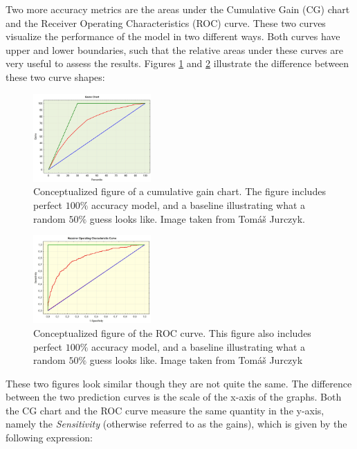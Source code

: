             Two more accuracy metrics are the areas under the Cumulative Gain (CG) chart and the Receiver Operating Characteristics (ROC) curve. These two curves visualize the performance of the model in two different ways. Both curves have upper and lower boundaries, such that the relative areas under these curves are very useful to assess the results. Figures \ref{fig:conceptual_cumulative_gains} and \ref{fig:conceptual_ROC} illustrate the difference between these two curve shapes:
            \begin{figure}[H]
            	\centering
            	\includegraphics[width=0.4\textwidth]{figures/gains_chart.jpg}
            	\caption{Conceptualized figure of a cumulative gain chart. The figure includes perfect $100\%$ accuracy model, and a baseline illustrating what a random $50\%$ guess looks like. Image taken from Tomáš Jurczyk.}
            	\label{fig:conceptual_cumulative_gains}
            \end{figure}
	        \begin{figure}[H]
	        	\centering
	        	\includegraphics[width=0.4\textwidth]{figures/ROC.jpg}
	        	\caption{Conceptualized figure of the ROC curve. This figure also includes perfect $100\%$ accuracy model, and a baseline illustrating what a random $50\%$ guess looks like. Image taken from Tomáš Jurczyk}
	        	\label{fig:conceptual_ROC}
	        \end{figure}
        	These two figures look similar though they are not quite the same. The difference between the two prediction curves is the scale of the x-axis of the graphs. Both the CG chart and the ROC curve measure the same quantity in the y-axis, namely the \textit{Sensitivity} (otherwise referred to as the gains), which is given by the following expression:
